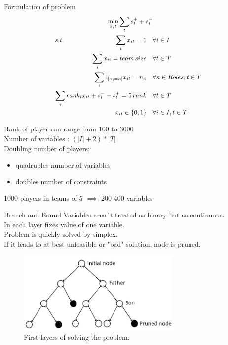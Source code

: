 \documentclass[11pt]{beamer}
\begin{document}
\begin{frame}{Formulation of problem}
\begin{equation*}
\small
\begin{aligned}
\underset{x_it}{\text{min}} \sum_{t} s_t^{+} + s_t^{-}&\\
s.t.\quad \quad\quad \quad\quad\quad\quad \quad \sum_t x_{it} =1   \quad &\forall i \in I\\
\sum_i x_{it} =team\,size   \quad &\forall t \in T\\
\sum_i \mathbb{I}_{[\kappa_i=\kappa ]} x_{it} = n_{\kappa} \quad &\forall \kappa \in Roles, t \in T\\ 
\sum_i rank_i x_{it} + s_t^{-} - s_t^{+} = 5 \,\overline{rank} \quad &\forall t \in T \\
x_{it} \in \{0,1\} \quad &\forall i \in I, t\in T
\end{aligned}
\end{equation*}
\end{frame}

\begin{frame}
Rank of player can range from 100 to 3000\\\vspace{0.4cm}
Number of variables : $(|I|+2)*|T|$\\\vspace{0.4 cm}
Doubling number of players:
\begin{itemize}
\item quadruples number of variables
\item doubles number of constraints\vspace{0.4 cm}
\end{itemize}
1000 players in teams of 5 $\implies$ 200 400 variables
\end{frame}

\begin{frame}{Branch and Bound}
Variables aren´t treated as binary but as continuous.\\
In each layer fixes value of one variable.\\
Problem is quickly solved by simplex.\\
If it leads to at best unfeasible or "bad" solution, node is pruned. 
\begin{figure}
\includegraphics[width=8cm]{branch.png}
\caption{First layers of solving the problem.}
\end{figure}
\end{frame}
\end{document}
